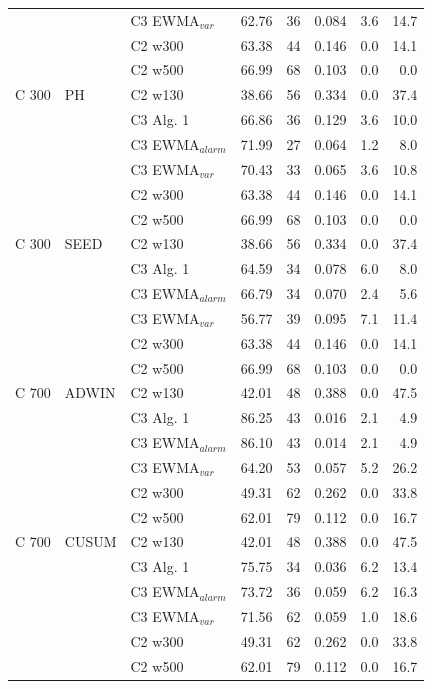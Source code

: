\begin{longtable}{lllrrrrr}
 &  & C3 EWMA$_{var}$ & 62.76 & 36 & 0.084 & 3.6 & 14.7 \\
 &  & C2 w300 & 63.38 & 44 & 0.146 & 0.0 & 14.1 \\
 &  & C2 w500 & 66.99 & 68 & 0.103 & 0.0 & 0.0 \\
\hline
C  300 & PH & C2 w130 & 38.66 & 56 & 0.334 & 0.0 & 37.4 \\
 &  & C3 Alg. 1 & 66.86 & 36 & 0.129 & 3.6 & 10.0 \\
 &  & C3 EWMA$_{alarm}$ & 71.99 & 27 & 0.064 & 1.2 & 8.0 \\
 &  & C3 EWMA$_{var}$ & 70.43 & 33 & 0.065 & 3.6 & 10.8 \\
 &  & C2 w300 & 63.38 & 44 & 0.146 & 0.0 & 14.1 \\
 &  & C2 w500 & 66.99 & 68 & 0.103 & 0.0 & 0.0 \\
\hline
C  300 & SEED & C2 w130 & 38.66 & 56 & 0.334 & 0.0 & 37.4 \\
 &  & C3 Alg. 1 & 64.59 & 34 & 0.078 & 6.0 & 8.0 \\
 &  & C3 EWMA$_{alarm}$ & 66.79 & 34 & 0.070 & 2.4 & 5.6 \\
 &  & C3 EWMA$_{var}$ & 56.77 & 39 & 0.095 & 7.1 & 11.4 \\
 &  & C2 w300 & 63.38 & 44 & 0.146 & 0.0 & 14.1 \\
 &  & C2 w500 & 66.99 & 68 & 0.103 & 0.0 & 0.0 \\
\hline
C  700 & ADWIN & C2 w130 & 42.01 & 48 & 0.388 & 0.0 & 47.5 \\
 &  & C3 Alg. 1 & 86.25 & 43 & 0.016 & 2.1 & 4.9 \\
 &  & C3 EWMA$_{alarm}$ & 86.10 & 43 & 0.014 & 2.1 & 4.9 \\
 &  & C3 EWMA$_{var}$ & 64.20 & 53 & 0.057 & 5.2 & 26.2 \\
 &  & C2 w300 & 49.31 & 62 & 0.262 & 0.0 & 33.8 \\
 &  & C2 w500 & 62.01 & 79 & 0.112 & 0.0 & 16.7 \\
\hline
C  700 & CUSUM & C2 w130 & 42.01 & 48 & 0.388 & 0.0 & 47.5 \\
 &  & C3 Alg. 1 & 75.75 & 34 & 0.036 & 6.2 & 13.4 \\
 &  & C3 EWMA$_{alarm}$ & 73.72 & 36 & 0.059 & 6.2 & 16.3 \\
 &  & C3 EWMA$_{var}$ & 71.56 & 62 & 0.059 & 1.0 & 18.6 \\
 &  & C2 w300 & 49.31 & 62 & 0.262 & 0.0 & 33.8 \\
 &  & C2 w500 & 62.01 & 79 & 0.112 & 0.0 & 16.7 \\

\end{longtable}
